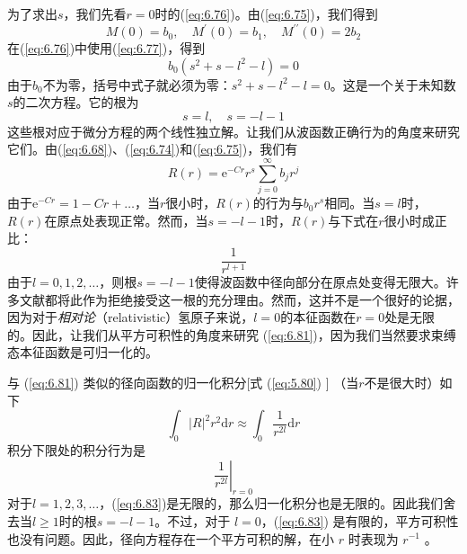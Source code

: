   为了求出$s$，我们先看$r=0$时的(\ref{eq:6.76})。由(\ref{eq:6.75})，我们得到
   \begin{equation}
        M\left(0\right) = b_0, \quad M^{\prime}\left(0\right) = b_1, \quad M^{\prime\prime}\left(0\right) = 2b_2
        \label{eq:6.77}
   \end{equation}
   在(\ref{eq:6.76})中使用(\ref{eq:6.77})，得到
   \begin{equation}
        b_0\left(s^2+s-l^2-l\right) = 0
        \label{eq:6.78}
   \end{equation}
   由于$b_0$不为零，括号中式子就必须为零：$s^2+s-l^2-l=0$。这是一个关于未知数$s$的二次方程。它的根为
   \begin{equation}
        s = l, \quad s = -l-1
        \label{eq:6.79}
    \end{equation}
    这些根对应于微分方程的两个线性独立解。让我们从波函数正确行为的角度来研究它们。由(\ref{eq:6.68})、(\ref{eq:6.74})和(\ref{eq:6.75})，我们有
    \begin{equation}
        R\left(r\right) = \mathrm{e}^{-Cr}r^s\sum_{j=0}^{\infty}b_jr^j
        \label{eq:6.80}
    \end{equation}
    由于$\mathrm{e}^{-Cr} = 1-Cr+\ldots$，当$r$很小时，$R\left(r\right)$的行为与$b_0r^s$相同。当$s=l$时，$R\left(r\right)$在原点处表现正常。然而，当$s = -l-1$时，$R\left(r\right)$与下式在$r$很小时成正比：
    \begin{equation}
        \frac{1}{r^{l+1}}
        \label{eq:6.81}
    \end{equation}
    由于$l=0,1,2,\ldots$，则根$s=-l-1$使得波函数中径向部分在原点处变得无限大。许多文献都将此作为拒绝接受这一根的充分理由。然而，这并不是一个很好的论据，因为对于\textit{相对论}（relativistic）氢原子来说，$l=0$的本征函数在$r=0$处是无限的。因此，让我们从平方可积性的角度来研究 (\ref{eq:6.81})，因为我们当然要求束缚态本征函数是可归一化的。

    与 (\ref{eq:6.81}) 类似的径向函数的归一化积分[式 (\ref{eq:5.80}) ] （当$r$不是很大时）如下
    \begin{equation}
        \int_{0}\left|R\right|^2r^2\mathrm{d}r \approx \int_{0}\frac{1}{r^{2l}}\mathrm{d}r
        \label{eq:6.82}
    \end{equation}
    积分下限处的积分行为是
    \begin{equation}
        \left.\frac{1}{r^{2l}}\right|_{r=0}
        \label{eq:6.83}
    \end{equation}
    对于$l=1,2,3,\ldots$，(\ref{eq:6.83})是无限的，那么归一化积分也是无限的。因此我们舍去当$l \geq 1$时的根$s = -l-1$。不过，对于 $l=0$，(\ref{eq:6.83}) 是有限的，平方可积性也没有问题。因此，径向方程存在一个平方可积的解，在小 $r$ 时表现为 $r^{-1}$ 。

